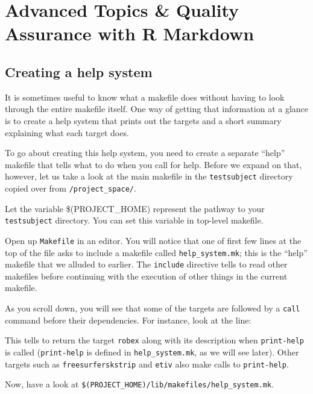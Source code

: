 \chapter{Advanced Topics \& Quality Assurance with R Markdown} 
\label{sec:practicum4}

\section{Creating a \maken{} help system}
It is sometimes useful to know what a makefile does without having to look through the entire makefile itself. One way of getting that information at a glance is to create a \maken{} help system that prints out the targets and a short summary explaining what each target does. 

To go about creating this help system, you need to create a separate ``help'' makefile that tells \maken{} what to do when you call for help. Before we expand on that, however, let us take a look at the main makefile in the \texttt{testsubject} directory copied over from \texttt{/project_space/}.

Let the variable \$(PROJECT_HOME) represent the pathway to your \texttt{testsubject} directory. You can set this variable in top-level makefile.

Open up \texttt{Makefile} in an editor. You will notice that one of first few lines at the top of the file asks \maken{} to include a makefile called \texttt{help_system.mk}; this is the ``help'' makefile that we alluded to earlier. The \texttt{include} directive tells \maken{} to read other makefiles before continuing with the execution of other things in the current makefile.    

As you scroll down, you will see that some of the targets are followed by a \texttt{call} command before their dependencies. For instance, look at the line:

This tells \maken{} to return the target \texttt{robex} along with its description when \texttt{print-help} is called (\texttt{print-help} is defined in \texttt{help_system.mk}, as we will see later). Other targets such as \texttt{freesurferskstrip} and \texttt{etiv} also make calls to \texttt{print-help}.

Now, have a look at \texttt{\$(PROJECT_HOME)/lib/makefiles/help_system.mk}.

